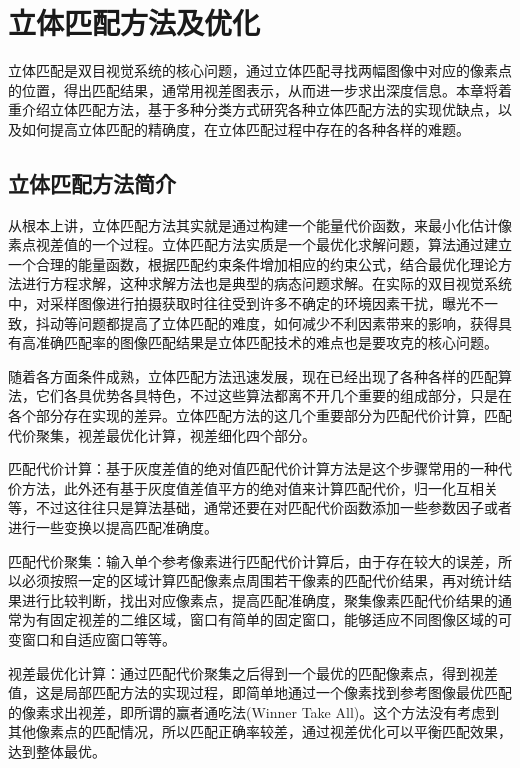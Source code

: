 
\chapter{立体匹配方法及优化}

立体匹配是双目视觉系统的核心问题，通过立体匹配寻找两幅图像中对应的像素点的位置，得出匹配结果，通常用视差图表示，从而进一步求出深度信息。本章将着重介绍立体匹配方法，基于多种分类方式研究各种立体匹配方法的实现优缺点，以及如何提高立体匹配的精确度，在立体匹配过程中存在的各种各样的难题。

\section{立体匹配方法简介}

从根本上讲，立体匹配方法其实就是通过构建一个能量代价函数，来最小化估计像素点视差值的一个过程。立体匹配方法实质是一个最优化求解问题，算法通过建立一个合理的能量函数，根据匹配约束条件增加相应的约束公式，结合最优化理论方法进行方程求解，这种求解方法也是典型的病态问题求解。在实际的双目视觉系统中，对采样图像进行拍摄获取时往往受到许多不确定的环境因素干扰，曝光不一致，抖动等问题都提高了立体匹配的难度，如何减少不利因素带来的影响，获得具有高准确匹配率的图像匹配结果是立体匹配技术的难点也是要攻克的核心问题。

随着各方面条件成熟，立体匹配方法迅速发展，现在已经出现了各种各样的匹配算法，它们各具优势各具特色，不过这些算法都离不开几个重要的组成部分，只是在各个部分存在实现的差异。立体匹配方法的这几个重要部分为匹配代价计算，匹配代价聚集，视差最优化计算，视差细化四个部分。

匹配代价计算：基于灰度差值的绝对值匹配代价计算方法是这个步骤常用的一种代价方法，此外还有基于灰度值差值平方的绝对值来计算匹配代价，归一化互相关等，不过这往往只是算法基础，通常还要在对匹配代价函数添加一些参数因子或者进行一些变换以提高匹配准确度。

匹配代价聚集：输入单个参考像素进行匹配代价计算后，由于存在较大的误差，所以必须按照一定的区域计算匹配像素点周围若干像素的匹配代价结果，再对统计结果进行比较判断，找出对应像素点，提高匹配准确度，聚集像素匹配代价结果的通常为有固定视差的二维区域，窗口有简单的固定窗口，能够适应不同图像区域的可变窗口和自适应窗口等等。

视差最优化计算：通过匹配代价聚集之后得到一个最优的匹配像素点，得到视差值，这是局部匹配方法的实现过程，即简单地通过一个像素找到参考图像最优匹配的像素求出视差，即所谓的赢者通吃法(Winner Take All)。这个方法没有考虑到其他像素点的匹配情况，所以匹配正确率较差，通过视差优化可以平衡匹配效果，达到整体最优。

